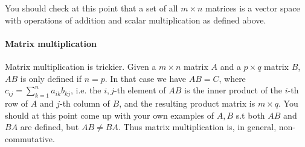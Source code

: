 \documentclass[12pt,oneside]{article}
\begin{document}
You should check at this point that a set of all $m \times n$
matrices is a vector space with operations of addition and scalar
multiplication as defined above.\\

\paragraph{Matrix multiplication}

Matrix multiplication is trickier. Given a $m \times n$ matrix $A$
and a $p \times q$ matrix $B$, $AB$ is only defined if $n = p$. In
that case we have $AB = C$, where $c_{ij} =
\displaystyle\sum_{k=1}^{n} {a_{ik} b_{kj}}$, i.e. the $i,j$-th
element of $AB$ is the inner product of the $i$-th row of $A$ and
$j$-th column of $B$, and the resulting product matrix is $m \times
q$. You should at this point come up with your own examples of $A, B$
s.t both $AB$ and $BA$ are defined, but $AB \neq BA$. Thus matrix
multiplication is, in general, non-commutative. 
\end{document}
